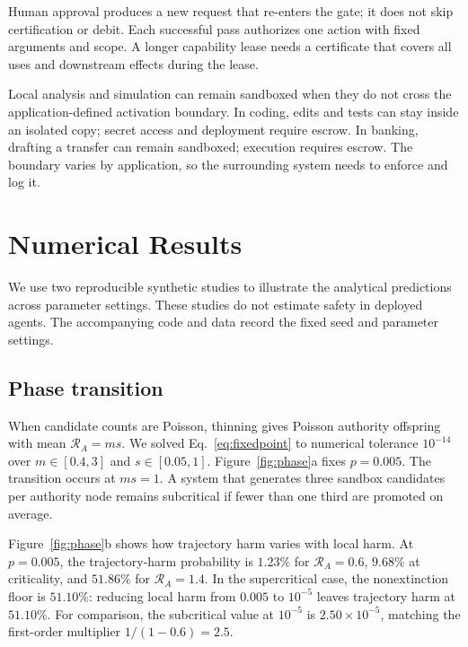 \documentclass[sigconf,nonacm]{acmart}
\newcommand{\RA}{\mathcal{R}_{\!A}}
\begin{document}
Human approval produces a new request that re-enters the gate; it does not skip certification or
debit.  Each successful pass authorizes one action with fixed arguments and scope.  A longer
capability lease needs a certificate that covers all uses and downstream effects during the lease.

Local analysis and simulation can remain sandboxed when they do not cross the application-defined
activation boundary.  In coding, edits and tests can stay inside an isolated copy; secret access
and deployment require escrow.  In banking, drafting a transfer can remain sandboxed; execution
requires escrow.  The boundary varies by application, so the surrounding system needs to enforce
and log it.

\section{Numerical Results}

We use two reproducible synthetic studies to illustrate the analytical predictions across
parameter settings.  These studies do not estimate safety in deployed agents.  The accompanying
code and data record the fixed seed and parameter settings.

\subsection{Phase transition}

When candidate counts are Poisson, thinning gives Poisson authority offspring with mean
$\RA=ms$.  We solved Eq.~\eqref{eq:fixedpoint} to numerical tolerance $10^{-14}$ over
$m\in[0.4,3]$ and $s\in[0.05,1]$.  Figure~\ref{fig:phase}a fixes $p=0.005$.  The transition occurs
at $ms=1$.  A system that generates three sandbox candidates per authority node remains
subcritical if fewer than one third are promoted on average.

Figure~\ref{fig:phase}b shows how trajectory harm varies with local harm.  At $p=0.005$, the
trajectory-harm probability is $1.23\%$ for $\RA=0.6$, $9.68\%$ at criticality, and $51.86\%$
for $\RA=1.4$.  In the supercritical case, the nonextinction floor is $51.10\%$: reducing local
harm from $0.005$ to $10^{-5}$ leaves trajectory harm at $51.10\%$.  For comparison, the
subcritical value at $10^{-5}$ is $2.50\times10^{-5}$, matching the first-order multiplier
$1/(1-0.6)=2.5$.
\end{document}
